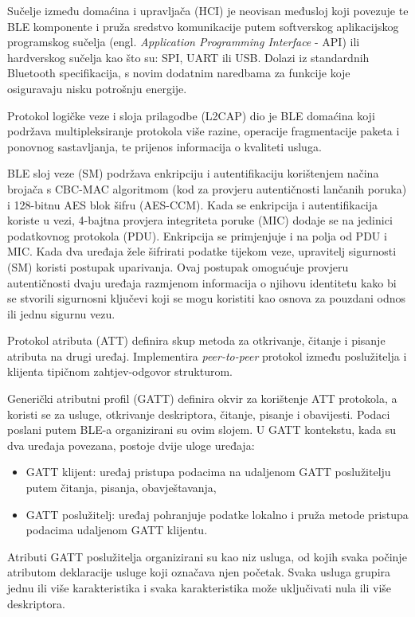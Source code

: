 Sučelje između domaćina i upravljača (HCI) je neovisan međusloj koji povezuje te BLE komponente i pruža sredstvo komunikacije putem softverskog aplikacijskog programskog sučelja (engl. \textit{Application Programming Interface} - API) ili hardverskog sučelja kao što su: SPI, UART ili USB. Dolazi iz standardnih Bluetooth specifikacija, s novim dodatnim naredbama za funkcije koje osiguravaju nisku potrošnju energije.

Protokol logičke veze i sloja prilagodbe (L2CAP) dio je BLE domaćina koji podržava multipleksiranje protokola više razine, operacije fragmentacije paketa i ponovnog sastavljanja, te prijenos informacija o kvaliteti usluga.

BLE sloj veze (SM) podržava enkripciju i autentifikaciju korištenjem načina brojača s CBC-MAC algoritmom (kod za provjeru autentičnosti lančanih poruka) i 128-bitnu AES blok šifru (AES-CCM). Kada se enkripcija i autentifikacija koriste u vezi, 4-bajtna provjera integriteta poruke (MIC) dodaje se na jedinici podatkovnog protokola (PDU). Enkripcija se primjenjuje i na polja od PDU i MIC. Kada dva uređaja žele šifrirati podatke tijekom veze, upravitelj sigurnosti (SM) koristi postupak uparivanja. Ovaj postupak omogućuje provjeru autentičnosti dvaju uređaja razmjenom informacija o njihovu identitetu kako bi se stvorili sigurnosni ključevi koji se mogu koristiti kao osnova za pouzdani odnos ili jednu sigurnu vezu. 

Protokol atributa (ATT) definira skup metoda za otkrivanje, čitanje i pisanje atributa na drugi uređaj. Implementira \textit{peer-to-peer} protokol između poslužitelja i klijenta tipičnom zahtjev-odgovor strukturom. 

Generički atributni profil (GATT) definira okvir za korištenje ATT protokola, a koristi se za usluge, otkrivanje deskriptora, čitanje, pisanje i obavijesti. Podaci poslani putem BLE-a organizirani su ovim slojem.
U GATT kontekstu, kada su dva uređaja povezana, postoje dvije uloge uređaja:
\begin{itemize}
	\item GATT klijent: uređaj pristupa podacima na udaljenom GATT poslužitelju putem čitanja, pisanja, obavještavanja,
	\item  GATT poslužitelj: uređaj pohranjuje podatke lokalno i pruža metode pristupa podacima udaljenom GATT klijentu.
\end{itemize}

Atributi GATT poslužitelja organizirani su kao niz usluga, od kojih svaka počinje atributom deklaracije usluge koji označava njen početak. Svaka usluga grupira jednu ili više karakteristika i svaka karakteristika može uključivati nula ili više deskriptora.

